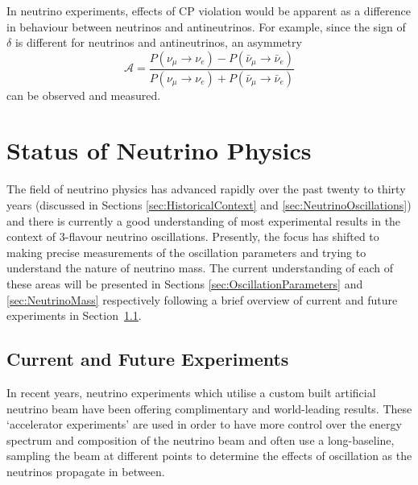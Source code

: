 In neutrino experiments, effects of CP violation would be apparent as a difference in behaviour between neutrinos and antineutrinos.  For example, since the sign of $\delta$ is different for neutrinos and antineutrinos, an asymmetry
\begin{equation}\label{eq:NeutrinoAntineutrinoAsymmetry}
  \mathcal{A} = \frac{P(\nu_{\mu}\rightarrow\nu_e)-P(\bar{\nu}_{\mu}\rightarrow\bar{\nu}_e)}{P(\nu_{\mu}\rightarrow\nu_e)+P(\bar{\nu}_{\mu}\rightarrow\bar{\nu}_e)}
\end{equation}
can be observed and measured.

\section{Status of Neutrino Physics}\label{sec:NeutrinoPhysicsStatus}

The field of neutrino physics has advanced rapidly over the past twenty to thirty years (discussed in Sections \ref{sec:HistoricalContext} and \ref{sec:NeutrinoOscillations}) and there is currently a good understanding of most experimental results in the context of 3-flavour neutrino oscillations.  Presently, the focus has shifted to making precise measurements of the oscillation parameters and trying to understand the nature of neutrino mass.  The current understanding of each of these areas will be presented in Sections \ref{sec:OscillationParameters} and \ref{sec:NeutrinoMass} respectively following a brief overview of current and future experiments in Section~\ref{sec:CurrentExperiments}.

\subsection{Current and Future Experiments}\label{sec:CurrentExperiments}

In recent years, neutrino experiments which utilise a custom built artificial neutrino beam have been offering complimentary and world-leading results.  These `accelerator experiments' are used in order to have more control over the energy spectrum and composition of the neutrino beam and often use a long-baseline, sampling the beam at different points to determine the effects of oscillation as the neutrinos propagate in between.

